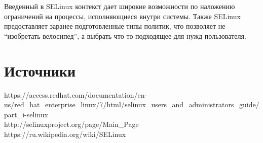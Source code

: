 \documentclass{article}
\begin{document}
Введенный в SELinux контекст дает широкие возможности по наложению ограничений на процессы, исполняющиеся внутри системы. Также SELinux предоставляет заранее подготовленные типы политик, что позволяет не “изобретать велосипед”, а выбрать что-то подходящее для нужд пользователя.


\section{Источники}
https://access.redhat.com/documentation/en-us/red\_hat\_enterprise\_linux/7/html/selinux\_users\_and\_administrators\_guide/part\_i-selinux\\
http://selinuxproject.org/page/Main\_Page\\
https://ru.wikipedia.org/wiki/SELinux
\end{document}
